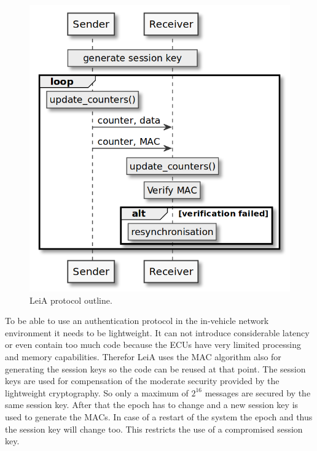 \begin{figure}[ht]
    \centering
    \captionsetup{justification=centering}
	\includegraphics[width=0.9\linewidth]{Figures/LeiA_outline.png}
	\caption[]{LeiA protocol outline.}\label{fig:leia_outline}
\end{figure}

To be able to use an authentication protocol in the in-vehicle network
environment it needs to be lightweight. It can not introduce considerable
latency or even contain too much code because the ECUs have very limited
processing and memory capabilities. Therefor LeiA uses the MAC algorithm also for
generating the session keys so the code can be reused at that point. The session
keys are used for compensation of the moderate security provided by the
lightweight cryptography. So only a maximum of \( 2^{16} \) messages are secured
by the same session key. After that the epoch has to change and a new session
key is used to generate the MACs. In case of a restart of the system the epoch
and thus the session key will change too. This restricts the use of a
compromised session key.

